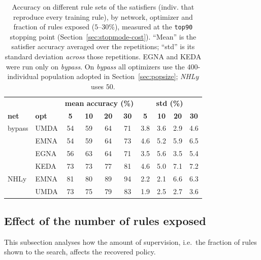 \begin{table}[h!]
\centering
\small
\setlength{\tabcolsep}{5pt}
\begin{tabular}{ll|cccc|cccc}
\hline
 & & \multicolumn{4}{c|}{\textbf{mean accuracy (\%)}}
   & \multicolumn{4}{c}{\textbf{std (\%)}}\\
\textbf{net} & \textbf{opt}
 & \textbf{5} & \textbf{10} & \textbf{20} & \textbf{30}
 & \textbf{5} & \textbf{10} & \textbf{20} & \textbf{30}\\
\hline
bypass & UMDA & 54 & 59 & 64 & 71 & 3.8 & 3.6 & 2.9 & 4.6\\
       & EMNA & 54 & 59 & 64 & 73 & 4.6 & 5.2 & 5.9 & 6.5\\
       & EGNA & 56 & 63 & 64 & 71 & 3.5 & 5.6 & 3.5 & 5.4\\
       & KEDA & 73 & 73 & 77 & 81 & 4.6 & 5.0 & 7.1 & 7.2\\
\hline
NHLy   & EMNA & 81 & 80 & 89 & 94 & 2.2 & 2.1 & 6.6 & 6.3\\
       & UMDA & 73 & 75 & 79 & 83 & 1.9 & 2.5 & 2.7 & 3.6\\
\hline
\end{tabular}
\caption{Accuracy on different rule sets of the satisfiers (indiv. that reproduce every training rule), by network, optimizer and fraction of rules exposed ($5$--$30\%$), measured at the \texttt{top90} stopping point (Section~\ref{sec:stopmode-cost}). ``Mean'' is the satisfier accuracy
averaged over the repetitions; ``std'' is its standard deviation \emph{across} those repetitions. EGNA and KEDA
were run only on \emph{bypass}. On \emph{bypass} all optimizers use the $400$-individual population adopted in Section~\ref{sec:popsize}; \emph{NHLy} uses $50$.}
\label{tab:stopmode-satisfiers}
\end{table}

\subsection{Effect of the number of rules exposed}

This subsection analyses how the amount of supervision, i.e.\ the fraction of
rules shown to the search, affects the recovered policy. 

